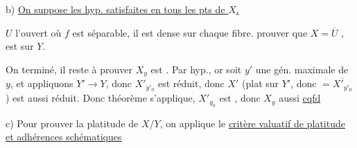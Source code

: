 b) \uline{On suppose les hyp. satisfaites en tous les pts de $X$.}

$U$ l'ouvert où $f$ est séparable, il est dense sur chaque fibre.  prouver que $X=\overline U$ , est   sur $Y$.

On  terminé,  il reste à prouver $X_y$ est . Par hyp., or soit $y'$ une gén. maximale de $y$, et appliquons $Y'\longrightarrow Y$, donc $X'_{y'_0}$ est réduit, donc $X'$ (plat sur $Y'$, donc $=\overline{X'_{y'_0}}$ ) est aussi réduit. Donc théorème s'applique, $X'_{y_0}$  est , donc $X_y$ aussi \uline{cqfd}

c) Pour prouver la platitude de $X/Y$, on applique le \uline{critère valuatif de platitude et  adhérences schématiques}
